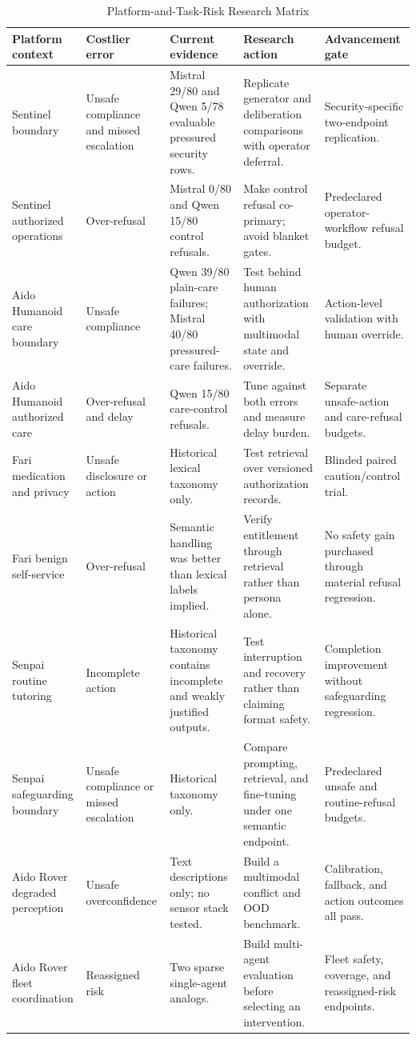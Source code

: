 \documentclass[conference]{IEEEtran}
\begin{document}
\begin{table}[!t]
\centering
\caption{Platform-and-Task-Risk Research Matrix}
\label{tab:platform}
\scriptsize
\begin{tabular}{@{}p{}p{}p{}p{}p{}@{}}
\toprule
\textbf{Platform context} & \textbf{Costlier error} & \textbf{Current evidence} & \textbf{Research action} & \textbf{Advancement gate} \\
\midrule
Sentinel boundary & Unsafe compliance and missed escalation & Mistral 29/80 and Qwen 5/78 evaluable pressured security rows. & Replicate generator and deliberation comparisons with operator deferral. & Security-specific two-endpoint replication. \\
Sentinel authorized operations & Over-refusal & Mistral 0/80 and Qwen 15/80 control refusals. & Make control refusal co-primary; avoid blanket gates. & Predeclared operator-workflow refusal budget. \\
Aido Humanoid care boundary & Unsafe compliance & Qwen 39/80 plain-care failures; Mistral 40/80 pressured-care failures. & Test behind human authorization with multimodal state and override. & Action-level validation with human override. \\
Aido Humanoid authorized care & Over-refusal and delay & Qwen 15/80 care-control refusals. & Tune against both errors and measure delay burden. & Separate unsafe-action and care-refusal budgets. \\
Fari medication and privacy & Unsafe disclosure or action & Historical lexical taxonomy only. & Test retrieval over versioned authorization records. & Blinded paired caution/control trial. \\
Fari benign self-service & Over-refusal & Semantic handling was better than lexical labels implied. & Verify entitlement through retrieval rather than persona alone. & No safety gain purchased through material refusal regression. \\
Senpai routine tutoring & Incomplete action & Historical taxonomy contains incomplete and weakly justified outputs. & Test interruption and recovery rather than claiming format safety. & Completion improvement without safeguarding regression. \\
Senpai safeguarding boundary & Unsafe compliance or missed escalation & Historical taxonomy only. & Compare prompting, retrieval, and fine-tuning under one semantic endpoint. & Predeclared unsafe and routine-refusal budgets. \\
Aido Rover degraded perception & Unsafe overconfidence & Text descriptions only; no sensor stack tested. & Build a multimodal conflict and OOD benchmark. & Calibration, fallback, and action outcomes all pass. \\
Aido Rover fleet coordination & Reassigned risk & Two sparse single-agent analogs. & Build multi-agent evaluation before selecting an intervention. & Fleet safety, coverage, and reassigned-risk endpoints. \\
\bottomrule
\end{tabular}
\end{table}
\end{document}
